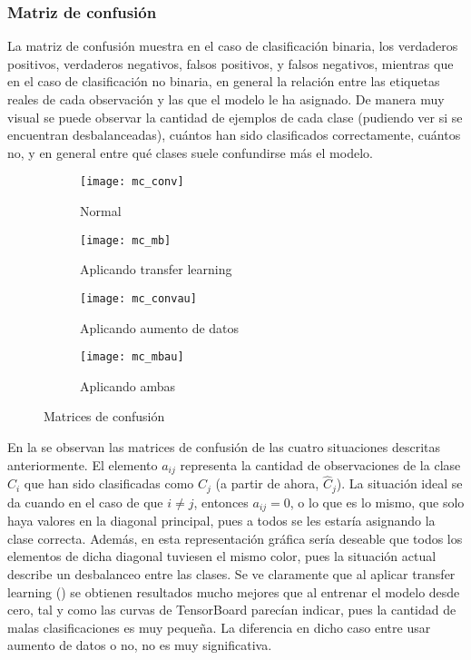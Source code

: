 			\subsubsection{Matriz de confusión}
			
				La matriz de confusión muestra en el caso de clasificación binaria, los verdaderos positivos, verdaderos negativos, falsos positivos, y falsos negativos, mientras que en el caso de clasificación no binaria, en general la relación entre las etiquetas reales de cada observación y las que el modelo le ha asignado\cite{confusion}. De manera muy visual se puede observar la cantidad de ejemplos de cada clase (pudiendo ver si se encuentran desbalanceadas), cuántos han sido clasificados correctamente, cuántos no, y en general entre qué clases suele confundirse más el modelo. \\
				
				\begin{figure}[!h]
					\centering
					\begin{subfigure}{.4\textwidth}
						\centering
						\texttt{[image: mc\_conv]}
						\caption{Normal}
						\label{fig:mc_conv}
					\end{subfigure}\hfill
					\begin{subfigure}{.4\textwidth}
						\centering
						\texttt{[image: mc\_mb]}
						\caption{Aplicando transfer learning}
						\label{fig:mc_mb}
					\end{subfigure}
					\begin{subfigure}{.4\textwidth}
						\centering
						\texttt{[image: mc\_convau]}
						\caption{Aplicando aumento de datos}
						\label{fig:mc_convau}
					\end{subfigure}\hfill
					\begin{subfigure}{.4\textwidth}
						\centering
						\texttt{[image: mc\_mbau]}
						\caption{Aplicando ambas}
						\label{fig:mc_mbau}
					\end{subfigure}
					\caption{Matrices de confusión}
					\label{fig:mc}
				\end{figure}
				
				En la  se observan las matrices de confusión de las cuatro situaciones descritas anteriormente. El elemento $a_{ij}$ representa la cantidad de observaciones de la clase $C_i$ que han sido clasificadas como $C_j$ (a partir de ahora, $\hat{C}_j$). La situación ideal se da cuando en el caso de que $i \neq j$, entonces $a_{ij} = 0$, o lo que es lo mismo, que solo haya valores  en la diagonal principal, pues a todos se les estaría asignando la clase correcta. Además, en esta representación gráfica sería deseable que todos los elementos de dicha diagonal tuviesen el mismo color, pues la situación actual describe un desbalanceo entre las clases. Se ve claramente que al aplicar transfer learning () se obtienen resultados mucho mejores que al entrenar el modelo desde cero, tal y como las curvas de TensorBoard parecían indicar, pues la cantidad de malas clasificaciones es muy pequeña. La diferencia en dicho caso entre usar aumento de datos o no, no es muy significativa. \\
				

